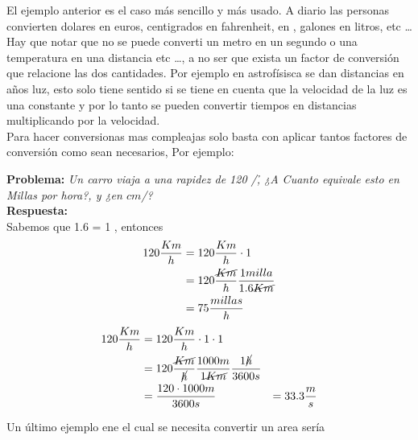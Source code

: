 El ejemplo anterior es el caso m\'as sencillo y m\'as usado. A diario las personas convierten dolares en euros, centigrados en fahrenheit, \km en \mile, galones en litros, etc \ldots\\
Hay que notar que no se puede converti un metro en un segundo o una temperatura en una distancia etc \ldots , a no ser que exista un factor de conversi\'on que relacione las dos cantidades. Por ejemplo en astrof\'isisca se dan distancias en a\~nos luz, esto solo tiene sentido si se tiene en cuenta que la velocidad de la luz es una constante y por lo tanto se pueden convertir tiempos en distancias multiplicando por la velocidad.\\
Para hacer conversionas mas compleajas solo basta con aplicar tantos factores de conversi\'on como sean necesarios, Por ejemplo:
\begin{example}
\begin{tcolorbox}[colback=green!5!white,colframe=green!75!black,boxrule=0.5pt,arc=4pt,left=6pt,right=6pt,top=6pt,bottom=6pt,boxsep=0pt]
\textbf{Problema:} \textit{Un carro viaja a una rapidez de 120 \km/\h, ¿A Cuanto equivale esto en Millas por hora?, y ¿en $cm$/\s?}\\
\textbf{Respuesta:}\\ 
Sabemos que 1.6 \km = 1 \mile, entonces\\
\begin{align}
120 \frac{Km}{h} & = 120 \frac{Km}{h} \cdot 1 \\
                 & = 120 \frac{\cancel{Km}}{h} \frac{1 milla}{1.6 \cancel{Km}} \\ 
                 & = 75 \frac{millas}{h}
\end{align}
\begin{align}
120 \frac{Km}{h} & = 120 \frac{Km}{h} \cdot 1 \cdot 1 \\
                 & = 120 \frac{\cancel{Km}}{\cancel{h}} \frac{1000 m}{1 \cancel{Km}}\frac{1 \cancel{h}}{3600 s} \\
                 & = \frac{120 \cdot 1000 m}{3600 s}
                 & = 33.3 \frac{m}{s}
\end{align}
\end{tcolorbox}
\end{example}  
Un \'ultimo ejemplo ene el cual se necesita convertir un area ser\'ia
